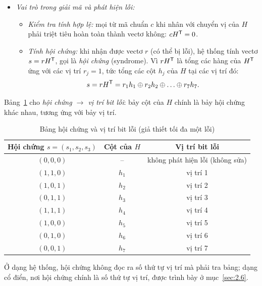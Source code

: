 \begin{itemize}
  \item \emph{Vai trò trong giải mã và phát hiện lỗi:}
        \begin{itemize}
          \item \emph{Kiểm tra tính hợp lệ:} mọi từ mã chuẩn $c$ khi nhân với
                chuyển vị của $H$ phải triệt tiêu hoàn toàn thành vectơ
                không: $cH^{\mathsf{T}} = 0$.
          \item \emph{Tính hội chứng:} khi nhận được vectơ $r$ (có thể bị
                lỗi), hệ thống tính vectơ $s = rH^{\mathsf{T}}$, gọi là \emph{hội chứng}
                (syndrome). Vì $rH^{\mathsf{T}}$ là tổng các hàng của $H^{\mathsf{T}}$ ứng với các
                vị trí $r_j = 1$, tức tổng các cột $h_j$ của $H$ tại các vị
                trí đó:
                \[
                  s = r\HT = r_1 h_1 \xor r_2 h_2 \xor \dots \xor r_7 h_7 .
                \]
        \end{itemize}
\end{itemize}

Bảng~\ref{tab:hoichung} cho \emph{hội chứng $\to$ vị trí bit lỗi}: bảy cột của
$H$ chính là bảy hội chứng khác nhau, tương ứng với bảy vị trí.

\begin{table}[H]
\centering\small\renewcommand{\arraystretch}{1.1}
\caption{Bảng hội chứng và vị trí bit lỗi (giả thiết tối đa một lỗi)}
\label{tab:hoichung}
\begin{tabular}{|c|c|c|}
\hline
\textbf{Hội chứng} $s = (s_1, s_2, s_3)$ & \textbf{Cột của $H$} &
\textbf{Vị trí bit lỗi}\\ \hline
$(0,0,0)$ & -- & không phát hiện lỗi (không sửa)\\ \hline
$(1,1,0)$ & $h_1$ & vị trí 1\\ \hline
$(1,0,1)$ & $h_2$ & vị trí 2\\ \hline
$(0,1,1)$ & $h_3$ & vị trí 3\\ \hline
$(1,1,1)$ & $h_4$ & vị trí 4\\ \hline
$(1,0,0)$ & $h_5$ & vị trí 5\\ \hline
$(0,1,0)$ & $h_6$ & vị trí 6\\ \hline
$(0,0,1)$ & $h_7$ & vị trí 7\\ \hline
\end{tabular}
\end{table}

Ở dạng hệ thống, hội chứng không đọc ra số thứ tự vị trí mà phải tra bảng;
dạng cổ điển, nơi hội chứng chính là số thứ tự vị trí, được trình bày ở
mục~\ref{sec:2.6}.


